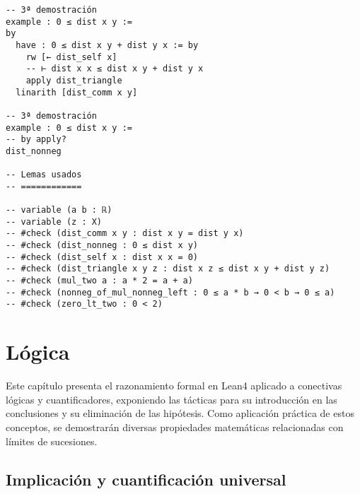 \begin{verbatim}
-- 3ª demostración
example : 0 ≤ dist x y :=
by
  have : 0 ≤ dist x y + dist y x := by
    rw [← dist_self x]
    -- ⊢ dist x x ≤ dist x y + dist y x
    apply dist_triangle
  linarith [dist_comm x y]

-- 3ª demostración
example : 0 ≤ dist x y :=
-- by apply?
dist_nonneg

-- Lemas usados
-- ============

-- variable (a b : ℝ)
-- variable (z : X)
-- #check (dist_comm x y : dist x y = dist y x)
-- #check (dist_nonneg : 0 ≤ dist x y)
-- #check (dist_self x : dist x x = 0)
-- #check (dist_triangle x y z : dist x z ≤ dist x y + dist y z)
-- #check (mul_two a : a * 2 = a + a)
-- #check (nonneg_of_mul_nonneg_left : 0 ≤ a * b → 0 < b → 0 ≤ a)
-- #check (zero_lt_two : 0 < 2)
\end{verbatim}

\chapter{Lógica}
\label{sec:orgdeb3120}

Este capítulo presenta el razonamiento formal en Lean4 aplicado a
conectivas lógicas y cuantificadores, exponiendo las tácticas para su
introducción en las conclusiones y su eliminación de las hipótesis. Como
aplicación práctica de estos conceptos, se demostrarán diversas
propiedades matemáticas relacionadas con límites de sucesiones.

\section{Implicación y cuantificación universal}
\label{sec:orgfee3eec}

